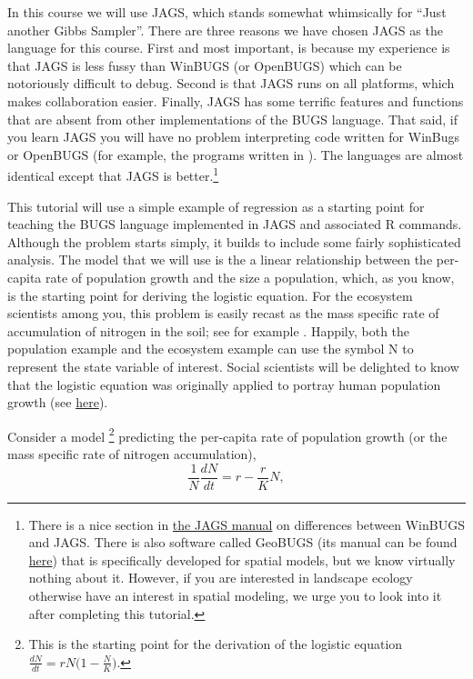 \documentclass[12pt,english]{article}
\begin{document}
In this course we will use JAGS, which stands somewhat whimsically for \enquote{Just another Gibbs Sampler}. There are three reasons we have chosen JAGS as the language for this course. First and most important, is because my experience is that JAGS is less fussy than WinBUGS (or OpenBUGS) which can be notoriously difficult to debug. Second is that JAGS runs on all platforms, which makes collaboration easier. Finally, JAGS has some terrific features and functions that are absent from other implementations of the BUGS language. That said, if you learn JAGS you will have no problem interpreting code written for WinBugs or OpenBUGS (for example, the programs written in \citealt{McCarthy_Bayes_book}). The languages are almost identical except that JAGS is better.\footnote{There is a nice section in \href{https://sourceforge.net/projects/mcmc-jags/files/Manuals/4.x/}{the JAGS manual} on differences between WinBUGS and JAGS. There is also software called GeoBUGS (its manual can be found \href{http://www.mrc-bsu.cam.ac.uk/bugs/winbugs/contents.shtml}{here}) that is specifically developed for spatial models, but we know virtually nothing about it. However, if you are interested in landscape ecology otherwise have an interest in spatial modeling, we urge you to look into it after completing this tutorial.}

\newpage 

This tutorial will use a simple example of regression as a starting point for teaching the BUGS language implemented in JAGS and associated R commands. Although the problem starts simply, it builds to include some fairly sophisticated analysis. The model that we will use is the a linear relationship between the per-capita rate of population growth and the size a population, which, as you know, is the starting point for deriving the logistic equation. For the ecosystem scientists among you, this problem is easily recast as the mass specific rate of accumulation of nitrogen in the soil; see for example \citet{Knops_Tilman}. Happily, both the population example and the ecosystem example can use the symbol N to represent the state variable of interest. Social scientists will be delighted to know that the logistic equation was originally applied to portray human population growth (see \href{http://monkeysuncle.stanford.edu/?p=933}{here}). 

Consider a model \footnote{This is the starting point for the derivation of the logistic equation $\frac{dN}{dt}=rN\big(1-\frac{N}{K}\big)$.}
predicting the per-capita rate of population growth (or the mass specific rate of nitrogen accumulation),
\begin{equation}
\frac{1}{N}\frac{dN}{dt}=r-\frac{r}{K}N,
\end{equation}
\end{document}
